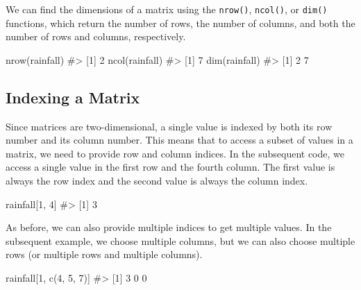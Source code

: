 \documentclass[
  letterpaper,
]{latex/krantz}
\makeatletter
\newenvironment{Shaded}{\begin{snugshade}}{\end{snugshade}}
\newcommand{\CommentTok}[1]{\textcolor[rgb]{0.37,0.37,0.37}{#1}}
\newcommand{\DecValTok}[1]{\textcolor[rgb]{0.68,0.00,0.00}{#1}}
\newcommand{\FunctionTok}[1]{\textcolor[rgb]{0.28,0.35,0.67}{#1}}
\newcommand{\NormalTok}[1]{\textcolor[rgb]{0.00,0.23,0.31}{#1}}
\newenvironment{kframe}{%
\medskip{}
\setlength{\fboxsep}{.8em}
 \def\at@end@of@kframe{}%
 \ifinner\ifhmode%
  \def\at@end@of@kframe{\end{minipage}}%
  \begin{minipage}{\columnwidth}%
 \fi\fi%
 \def\FrameCommand##1{\hskip\@totalleftmargin \hskip-\fboxsep
 \colorbox{shadecolor}{##1}\hskip-\fboxsep
     \hskip-\linewidth \hskip-\@totalleftmargin \hskip\columnwidth}%
 \MakeFramed {\advance\hsize-\width
   \@totalleftmargin\z@ \linewidth\hsize
   \@setminipage}}%
 {\par\unskip\endMakeFramed%
 \at@end@of@kframe}
\renewenvironment{Shaded}{\begin{kframe}}{\end{kframe}}
\makeatother
\begin{document}
We can find the dimensions of a matrix using the
\texttt{nrow()},
\texttt{ncol()}, or
\texttt{dim()} functions, which
return the number of rows, the number of columns, and both the number of
rows and columns, respectively.

\begin{Shaded}
\begin{Highlighting}[]
\FunctionTok{nrow}\NormalTok{(rainfall)}
\CommentTok{\#\textgreater{} [1] 2}
\FunctionTok{ncol}\NormalTok{(rainfall)}
\CommentTok{\#\textgreater{} [1] 7}
\FunctionTok{dim}\NormalTok{(rainfall)}
\CommentTok{\#\textgreater{} [1] 2 7}
\end{Highlighting}
\end{Shaded}

\subsection{\texorpdfstring{Indexing a Matrix
}{Indexing a Matrix }}\label{indexing-a-matrix}

Since matrices are two-dimensional, a single value is indexed by both
its row number and its column number. This means that to access a subset
of values in a matrix, we need to provide row and column indices. In the
subsequent code, we access a single value in the first row and the
fourth column. The first value is always the row index and the second
value is always the column index.

\begin{Shaded}
\begin{Highlighting}[]
\NormalTok{rainfall[}\DecValTok{1}\NormalTok{, }\DecValTok{4}\NormalTok{]}
\CommentTok{\#\textgreater{} [1] 3}
\end{Highlighting}
\end{Shaded}

As before, we can also provide multiple indices to get multiple values.
In the subsequent example, we choose multiple columns, but we can also
choose multiple rows (or multiple rows and multiple columns).

\begin{Shaded}
\begin{Highlighting}[]
\NormalTok{rainfall[}\DecValTok{1}\NormalTok{, }\FunctionTok{c}\NormalTok{(}\DecValTok{4}\NormalTok{, }\DecValTok{5}\NormalTok{, }\DecValTok{7}\NormalTok{)]}
\CommentTok{\#\textgreater{} [1] 3 0 0}
\end{Highlighting}
\end{Shaded}
\end{document}
